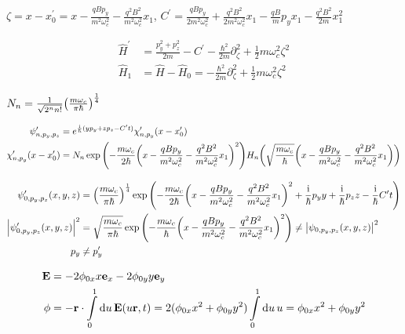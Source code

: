 \documentclass[a4paper,10pt]{article}
\newcommand{\mi}{\mathrm{i}}
\newcommand{\intl}{\int\limits}
\begin{document}
$\zeta = x-x_0^\prime=x-\frac{qBp_y}{m^2\omega_c^2}-\frac{q^2 B^2}{m^2\omega_c^2}x_1$,
$C^\prime=\frac{qBp_y}{2m^2\omega_c^2}+\frac{q^2 B^2}{2m^2\omega_c^2}x_1-\frac{qB}{m}p_y x_1-\frac{q^2B^2}{2m}x_1^2$

\begin{align}
	\hat{H}^\prime
	&=
    \frac{p_y^2+p_z^2}{2m}
	-
	C^\prime
	-
    \frac{\hbar^2}{2m}    
    \partial_\zeta^2
	+
	\frac{1}{2}
	m
	\omega_c^2
	\zeta^2
\\
	\hat{H}_1
	&=	
	\hat{H}-\hat{H}_0
	=
	-
    \frac{\hbar^2}{2m}    
    \partial_\zeta^2
	+
	\frac{1}{2}
	m
	\omega_c^2
	\zeta^2
\end{align}

$N_n=\frac{1}{\sqrt{2^n n!}}\pqty{\frac{m\omega_c}{\pi\hbar}}^{\frac{1}{4}}$

\begin{align}
	\psi^\prime_{n,p_y,p_z}
	&=
	e^{\frac{\mi}{\hbar}(yp_y+zp_z-C^\prime t)}
	\chi^\prime_{n,p_y}
	(x-x_0^\prime)
\\
	\chi^\prime_{n,p_y}
	(x-x_0^\prime)
	&=
	N_n
	\exp
	\pqty{
		-
		\frac{m\omega_c}{2\hbar}
		\pqty{
			x-\frac{qBp_y}{m^2\omega_c^2}-\frac{q^2 B^2}{m^2\omega_c^2}x_1
		}^2
	}
	H_n\pqty{
		\sqrt{
			\frac{m\omega_c}{\hbar}	
		}
		\pqty{
			x-\frac{qBp_y}{m^2\omega_c^2}-\frac{q^2 B^2}{m^2\omega_c^2}x_1
		}
	}
\end{align}

\begin{align}
	\psi^\prime_{0,p_y,p_z}
	(x,y,z)
	&=
	\pqty{
		\frac{m\omega_c}{\pi\hbar}
	}^{\frac{1}{4}}
	\exp
	\pqty{
		-
		\frac{m\omega_c}{2\hbar}
		\pqty{
			x-\frac{qBp_y}{m^2\omega_c^2}-\frac{q^2 B^2}{m^2\omega_c^2}x_1
		}^2
		+
		\frac{\mi}{\hbar}
		p_y y
		+
		\frac{\mi}{\hbar}
		p_z z
		-
		\frac{\mi}{\hbar}
		C^\prime t
	}
\\
	\abs{
		\psi^\prime_{0,p_y,p_z}
		(x,y,z)
	}^2
	&=
	\sqrt{
		\frac{m\omega_c}{\pi\hbar}
	}
	\exp
	\pqty{
		-
		\frac{m\omega_c}{\hbar}
		\pqty{
			x
			-\frac{qBp_y}{m^2\omega_c^2}
			-\frac{q^2 B^2}{m^2\omega_c^2}x_1
		}^2
	}
	\neq
	\abs{
		\psi_{0,p_y,p_z}
		(x,y,z)
	}^2
\\
	p_y
	&\neq
	p_y^\prime
\end{align}

\newpage

\begin{align}
    \vb{E}
    &=
    -2\phi_{0x} x\vb{e}_x
    -2\phi_{0y} y\vb{e}_y
\\
    \phi
    &=
    -
    \vb{r}
    \cdot
    \intl_0^1
    \dd{u}
    \vb{E}(u\vb{r},t)
    =
    2
    (
    		\phi_{0x}
    		x^2
    		+
    		\phi_{0y}
    		y^2
    	)
    \intl_0^1
    \dd{u}
    u
    =
    	\phi_{0x}
    	x^2
    	+
    	\phi_{0y}
    	y^2
\end{align}
\end{document}
